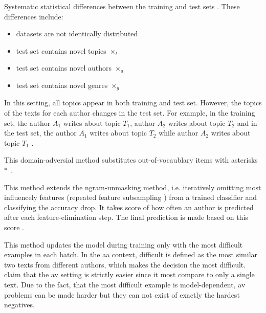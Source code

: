 \begin{definition}
    Systematic statistical differences between the training and test sets \cite{tyo_state_2022}.
    These differences include:
    \begin{itemize}
        \item datasets are not identically distributed
        \item test set contains novel topics $\times_t$
        \item test set contains novel authors $\times_a$
        \item test set contains novel genres $\times_g$
    \end{itemize}
\end{definition}

\begin{definition}
    In this setting, all topics appear in both training and test set. 
    However, the topics of the texts for each author changes in the test set.
    For example, in the training set, the author $A_1$ writes about topic $T_1$, author $A_2$ writes about topic $T_2$ 
    and in the test set, 
    the author $A_1$ writes about topic $T_2$ while author $A_2$ writes about topic $T_1$ \cite{tyo_state_2022}.
\end{definition}

\begin{definition}
    This domain-adversial method substitutes out-of-vocaublary items with asterisks $*$ \cite{tyo_state_2022}.
\end{definition}

\begin{definition}
    This method extends the ngram-unmasking method, i.e. iteratively omitting most influencely features (repeated feature subsampling \cite{koppel_determining_2014})
    from a trained classifier and classifying the accuracy drop.
    It takes score of how often an author is predicted after each feature-elimination step.
    The final prediction is made based on this score \cite{tyo_state_2022}.
\end{definition}


\begin{definition}
    This method updates the model during training only with the most difficult examples in each batch.
    In the \ac{aa} context, difficult is defined as the most similar two texts from different authors, 
    which makes the decision the most difficult.
    \citet{tyo_state_2022} claim that the \ac{av} setting is strictly easier since 
    it most compare to only a single text.
    Due to the fact, that the most difficult example is model-dependent, \ac{av} problems can be made harder 
    but they can not exist of exactly the hardest negatives.
\end{definition}
  